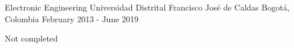 

\begin{cventries}

  \cventry
    {Electronic Engineering}
    {Universidad Distrital Francisco José de Caldas}
    {Bogotá, Colombia}
    {February 2013 - June 2019}
    {
      \begin{cvitems}
        \item {Not completed}
      \end{cvitems}
    }

\end{cventries}
